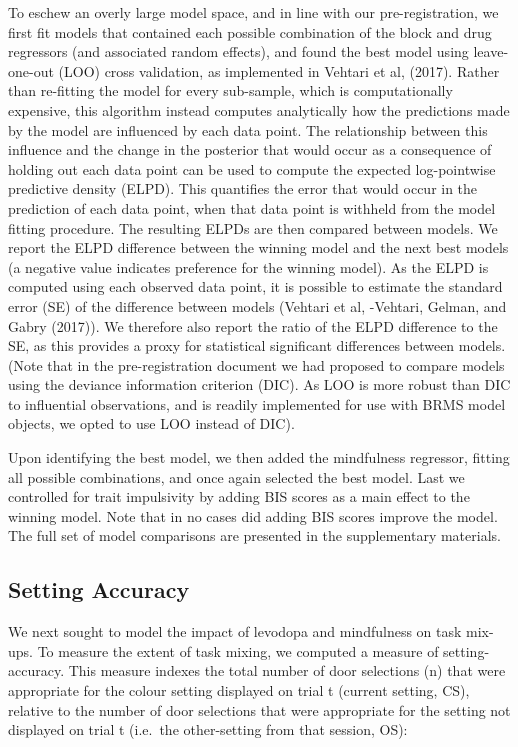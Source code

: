 \documentclass{article}
\begin{document}
To eschew an overly large model space, and in line with our
pre-registration, we first fit models that contained each possible
combination of the block and drug regressors (and associated random
effects), and found the best model using leave-one-out (LOO) cross
validation, as implemented in Vehtari et al, (2017). Rather than
re-fitting the model for every sub-sample, which is computationally
expensive, this algorithm instead computes analytically how the
predictions made by the model are influenced by each data point. The
relationship between this influence and the change in the posterior that
would occur as a consequence of holding out each data point can be used
to compute the expected log-pointwise predictive density (ELPD). This
quantifies the error that would occur in the prediction of each data
point, when that data point is withheld from the model fitting
procedure. The resulting ELPDs are then compared between models. We
report the ELPD difference between the winning model and the next best
models (a negative value indicates preference for the winning model). As
the ELPD is computed using each observed data point, it is possible to
estimate the standard error (SE) of the difference between models
(Vehtari et al, -Vehtari, Gelman, and Gabry (2017)). We therefore also
report the ratio of the ELPD difference to the SE, as this provides a
proxy for statistical significant differences between models. (Note that
in the pre-registration document we had proposed to compare models using
the deviance information criterion (DIC). As LOO is more robust than DIC
to influential observations, and is readily implemented for use with
BRMS model objects, we opted to use LOO instead of DIC).

Upon identifying the best model, we then added the mindfulness
regressor, fitting all possible combinations, and once again selected
the best model. Last we controlled for trait impulsivity by adding BIS
scores as a main effect to the winning model. Note that in no cases did
adding BIS scores improve the model. The full set of model comparisons
are presented in the supplementary materials.

\hypertarget{setting-accuracy}{%
\subsection{Setting Accuracy}\label{setting-accuracy}}

We next sought to model the impact of levodopa and mindfulness on task
mix-ups. To measure the extent of task mixing, we computed a measure of
setting-accuracy. This measure indexes the total number of door
selections (n) that were appropriate for the colour setting displayed on
trial t (current setting, CS), relative to the number of door selections
that were appropriate for the setting not displayed on trial t (i.e.~the
other-setting from that session, OS):
\end{document}

